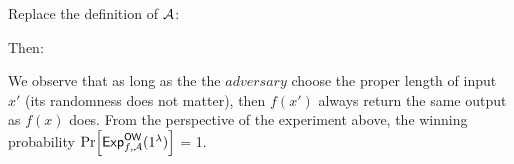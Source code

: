 Replace the definition of \(\mathcal{A}\):
\begin{center}
\end{center}

Then:
\begin{center}
\end{center}

We observe that as long as the the \(adversary\) choose the proper length of input \(x'\)
(its randomness does not matter), then \(f(x')\) always return the same output as \(f(x)\)
does. From the perspective of the experiment above, the winning probability
\(\prob{\mathsf{Exp}_{f, \adv}^{\mathsf{OW}}(1^\lambda)}\) = 1.

